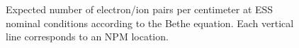 \begin{figure}[!ht]
	
	\caption[Expected number of electron/ion pairs per centimeter at ESS nominal conditions according to the Bethe equation]{Expected number of electron/ion pairs per centimeter at ESS nominal conditions according to the Bethe equation. Each vertical line corresponds to an NPM location.}
	\label{chap3:ess_primary_particles}
\end{figure}
